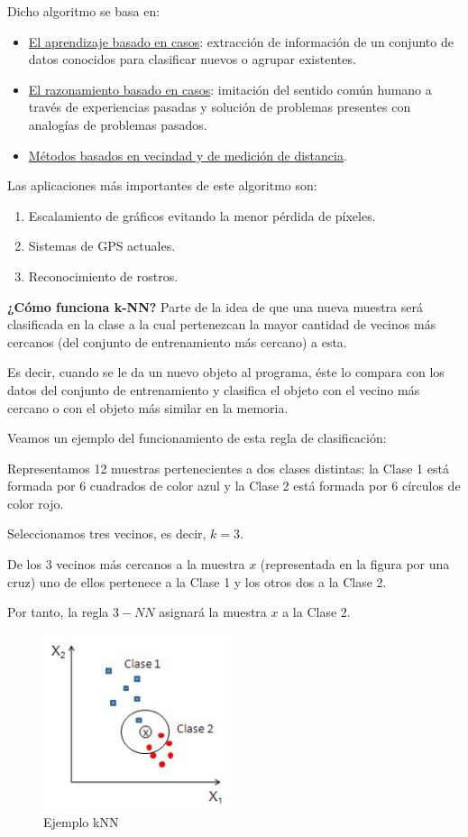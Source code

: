 \documentclass[a4paper, 11pt]{article} %
\begin{document}
Dicho algoritmo se basa en:
\begin{itemize}
    \item \underline{El aprendizaje basado en casos}: extracción de información de un conjunto de datos conocidos para clasificar nuevos o agrupar existentes.
    \item \underline{El razonamiento basado en casos}: imitación del sentido común humano a través de experiencias pasadas y solución de problemas presentes con analogías de problemas pasados.
    \item \underline{Métodos basados en vecindad y de medición de distancia}.
\end{itemize}

Las aplicaciones más importantes de este algoritmo son:
\begin{enumerate}
    \item Escalamiento de gráficos evitando la menor pérdida de píxeles.
    \item Sistemas de GPS actuales.
    \item Reconocimiento de rostros.
\end{enumerate}

\textbf{¿Cómo funciona k-NN?}
Parte de la idea de que una nueva muestra será clasificada en la clase a la cual pertenezcan la mayor cantidad de vecinos más cercanos (del conjunto de entrenamiento más cercano) a esta.

Es decir, cuando se le da un nuevo objeto al programa, éste lo compara con los datos del conjunto de entrenamiento y clasifica el objeto con el vecino más cercano o con el objeto más similar en la memoria.

Veamos un ejemplo del funcionamiento de esta regla de clasificación:
\begin{shaded}
Representamos 12 muestras pertenecientes a dos clases distintas: la Clase 1 está formada por 6 cuadrados de color azul y la Clase 2 está formada por 6 círculos de color rojo.

Seleccionamos tres vecinos, es decir, $k = 3$.

De los $3$ vecinos más cercanos a la muestra $x$ (representada en la figura por una cruz) uno de ellos pertenece a la Clase 1 y los otros dos a la Clase 2.

Por tanto, la regla $3-NN$ asignará la muestra $x$ a la Clase 2.
\end{shaded}

\begin{figure}[H]
\centering
\includegraphics[width=0.5\textwidth]{ejemploKNN.JPG}
\caption{Ejemplo kNN}
\label{Ejemplo kNN}
\end{figure}
\end{document}
